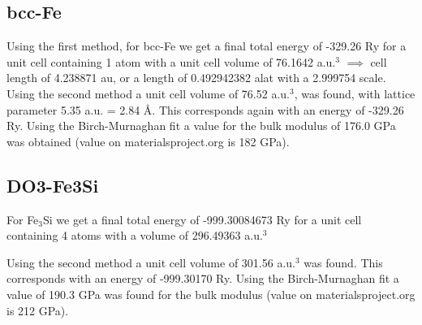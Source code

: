 \documentclass[twoside,twocolumn,11pt]{article} %
\begin{document}
\subsection{bcc-Fe}
Using the first method, for bcc-Fe we get a final total energy of
-329.26 Ry for a unit cell containing 1 atom with a unit cell volume
of 76.1642 a.u.$^3$ $\implies$ cell length of 4.238871 au, or a
length of 0.492942382 alat with a 2.999754 scale.\\ Using the second
method a unit cell volume of 76.52 a.u.$^3$, was found, with lattice
parameter 5.35 a.u. = 2.84 \AA. This corresponds again with an
energy of -329.26 Ry. Using the Birch-Murnaghan fit a value for the
bulk modulus of 176.0 GPa was obtained (value on
materialsproject.org is 182 GPa).
\subsection{DO3-Fe3Si}
For Fe$_3$Si we get a final total energy of -999.30084673 Ry for a
unit cell containing 4 atoms with a volume of 296.49363 a.u.$^3$

Using the second method a unit cell volume of 301.56 a.u.$^3$ was found. This corresponds with an energy of -999.30170 Ry. Using the Birch-Murnaghan fit a value of 190.3 GPa was found for the bulk modulus (value on materialsproject.org is 212 GPa).
\end{document}
